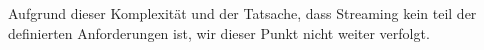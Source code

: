 Aufgrund dieser Komplexität und der Tatsache, dass Streaming kein teil der definierten Anforderungen ist, wir dieser Punkt nicht weiter verfolgt.



